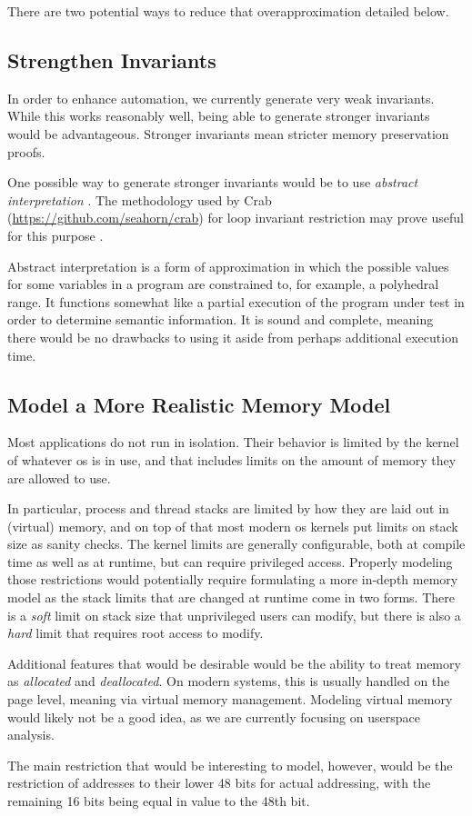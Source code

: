 There are two potential ways to reduce that overapproximation detailed below.

\subsection{Strengthen Invariants}
In order to enhance automation, we currently generate very weak invariants.
While this works reasonably well, being able to generate stronger invariants
would be advantageous. Stronger invariants mean stricter memory preservation proofs.

One possible way to generate stronger invariants would be to use
\emph{abstract interpretation}
\autocite{cousot1976static,cousot1977abstract}.
The methodology used by Crab (\url{https://github.com/seahorn/crab})
for loop invariant restriction may prove useful for this purpose
\autocite{gange2016abstract}.

Abstract interpretation is a form of approximation
in which the possible values for some variables in a program
are constrained to, for example, a polyhedral range.
It functions somewhat like a partial execution of the program under test
in order to determine semantic information.
It is sound and complete, meaning there would be no drawbacks to using it
aside from perhaps additional execution time.

\subsection{Model a More Realistic Memory Model}
Most applications do not run in isolation. Their behavior is limited by
the kernel of whatever \ac{os} is in use,
and that includes limits on the amount of memory they are allowed to use.

In particular, process and thread stacks are limited
by how they are laid out in (virtual) memory, and on top of that
most modern \ac{os} kernels put limits on stack size as sanity checks.
The kernel limits are generally configurable,
both at compile time as well as at runtime, but can require privileged access.
Properly modeling those restrictions
would potentially require formulating a more in-depth memory model
as the stack limits that are changed at runtime come in two forms.
There is a \emph{soft} limit on stack size that unprivileged users
can modify, but there is also a \emph{hard} limit
that requires root access to modify.

Additional features that would be desirable
would be the ability to treat memory as \emph{allocated} and \emph{deallocated}.
On modern systems, this is usually handled on the page level,
meaning via virtual memory management.
Modeling virtual memory would likely not be a good idea,
as we are currently focusing on userspace analysis.

The main restriction that would be interesting to model, however,
would be the restriction of addresses to their lower 48 bits for actual addressing,
with the remaining 16 bits being equal in value to the 48th bit.
